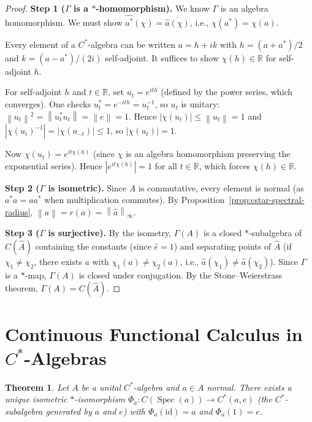 \documentclass[a4paper,12pt]{book}
\DeclareMathOperator{\Spec}{Spec}
\newcommand{\R}{\mathbb{R}}
\newcommand{\norm}[1]{\left\| #1 \right\|}
\newcommand{\abs}[1]{\left| #1 \right|}
\theoremstyle{definition}
\theoremstyle{plain}
\newtheorem{theorem}[definition]{Theorem}
\theoremstyle{remark}
\begin{document}
\begin{proof}
\textbf{Step 1 ($\Gamma$ is a $*$-homomorphism).}
We know $\Gamma$ is an algebra homomorphism. We must show
$\widehat{a^*}(\chi) = \overline{\hat{a}(\chi)}$, i.e., $\chi(a^*) = \overline{\chi(a)}$.

Every element of a $C^*$-algebra can be written $a = h + ik$ with
$h = (a + a^*)/2$ and $k = (a - a^*)/(2i)$ self-adjoint. It suffices to show
$\chi(h) \in \R$ for self-adjoint $h$.

For self-adjoint $h$ and $t \in \R$, set $u_t = e^{ith}$ (defined by the power
series, which converges). One checks $u_t^* = e^{-ith} = u_t^{-1}$, so $u_t$
is unitary: $\norm{u_t}^2 = \norm{u_t^* u_t} = \norm{e} = 1$.
Hence $\abs{\chi(u_t)} \le \norm{u_t} = 1$ and
$\abs{\chi(u_t)^{-1}} = \abs{\chi(u_{-t})} \le 1$, so $\abs{\chi(u_t)} = 1$.

Now $\chi(u_t) = e^{it\chi(h)}$ (since $\chi$ is an algebra homomorphism
preserving the exponential series). Hence $\abs{e^{it\chi(h)}} = 1$ for all
$t \in \R$, which forces $\chi(h) \in \R$.

\textbf{Step 2 ($\Gamma$ is isometric).}
Since $A$ is commutative, every element is normal (as $a^*a = aa^*$ when
multiplication commutes). By Proposition~\ref{prop:cstar-spectral-radius},
$\norm{a} = r(a) = \norm{\hat{a}}_\infty$.

\textbf{Step 3 ($\Gamma$ is surjective).}
By the isometry, $\Gamma(A)$ is a closed $*$-subalgebra of $C(\hat{A})$
containing the constants (since $\hat{e} = 1$) and separating points of
$\hat{A}$ (if $\chi_1 \ne \chi_2$, there exists $a$ with
$\chi_1(a) \ne \chi_2(a)$, i.e., $\hat{a}(\chi_1) \ne \hat{a}(\chi_2)$).
Since $\Gamma$ is a $*$-map, $\Gamma(A)$ is closed under conjugation.
By the Stone--Weierstrass theorem,
$\Gamma(A) = C(\hat{A})$.
\end{proof}


\section{Continuous Functional Calculus in $C^*$-Algebras}
\label{sec:func-calc-cstar}


\begin{theorem}\label{thm:func-calc-cstar}
Let $A$ be a unital $C^*$-algebra and $a \in A$ normal. There exists a unique
isometric $*$-isomorphism $\Phi_a \colon C(\Spec(a)) \to C^*(a, e)$ (the
$C^*$-subalgebra generated by $a$ and $e$) with $\Phi_a(\mathrm{id}) = a$ and
$\Phi_a(1) = e$.
\end{theorem}
\end{document}
